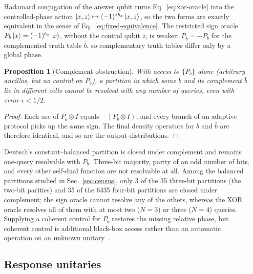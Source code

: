 \documentclass[
  aps,
  pra,
  reprint,
  nofootinbib
]{revtex4-2}
\newtheorem{proposition}{Proposition}
\begin{document}
Hadamard conjugation of the answer qubit turns Eq.~\eqref{eq:xor-oracle} into
the controlled-phase action \(\ket{x,z}\mapsto(-1)^{z b_x}\ket{x,z}\), so the
two forms are exactly equivalent in the sense of
Eq.~\eqref{eq:fixed-equivalence}. The restricted sign oracle
\(P_b\ket x=(-1)^{b_x}\ket x\), without the control qubit \(z\), is weaker:
\(P_{\bar b}=-P_b\) for the complemented truth table \(\bar b\), so
complementary truth tables differ only by a global phase.

\begin{proposition}[Complement obstruction]\label{prop:sign}
With access to \(\{P_b\}\) alone (arbitrary ancillas, but no control on
\(P_b\)), a partition in which some \(b\) and its complement \(\bar b\) lie in
different cells cannot be resolved with any number of queries, even with
error \(\epsilon<1/2\).
\end{proposition}

\begin{proof}
Each use of \(P_{\bar b}\otimes I\) equals \(-(P_b\otimes I)\), and every branch
of an adaptive protocol picks up the same sign. The final density operators for
\(b\) and \(\bar b\) are therefore identical, and so are the output
distributions.
\end{proof}

Deutsch's constant--balanced partition is closed under complement and remains
one-query resolvable with \(P_b\). Three-bit majority, parity of an odd number
of bits, and every other self-dual function are not resolvable at all.
Among the balanced partitions studied in Sec.~\ref{sec:census}, only 3 of the
35 three-bit partitions (the two-bit parities) and 35 of the 6435 four-bit
partitions are closed under complement; the sign oracle cannot resolve any of
the others, whereas the XOR oracle resolves all of them with at most two
(\(N=3\)) or three (\(N=4\)) queries. Supplying a coherent control for \(P_b\)
restores the missing relative phase, but coherent control is additional
black-box access rather than an automatic operation on an unknown
unitary~\cite{AraujoFeixCostaBrukner2014}.

\subsection{Response unitaries}
\end{document}
